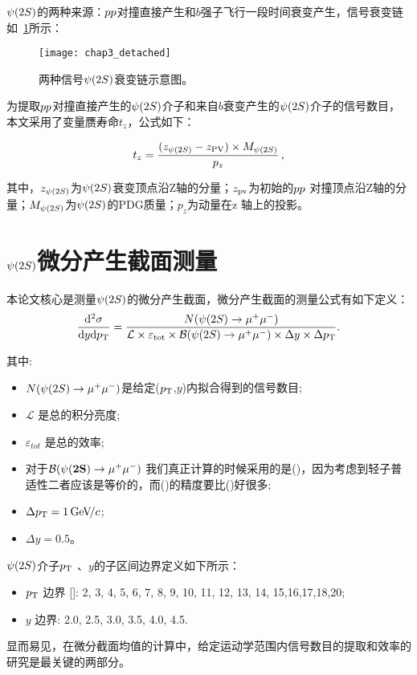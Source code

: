 ${\psi{(2S)}}$的两种来源：${pp}$对撞直接产生和$b$强子飞行一段时间衰变产生，信号衰变链如~\ref{decay}所示：
\begin{figure}[!h]
\centering
\texttt{[image: chap3\_detached]}
\caption{两种信号${\psi{(2S)}}$衰变链示意图。}
\label{decay}
\end{figure}
为提取${pp}$对撞直接产生的${\psi{(2S)}}$介子和来自$b$衰变产生的${\psi{(2S)}}$介子的信号数目，本文采用了变量赝寿命$t_{z}$，公式如下：

\begin{equation}\label{eq:tz}
t_z = \frac{(z_{{\psi{(2S)}}}-z_{\rm PV}) \times M_{{\psi{(2S)}}}}{p_z} \,,
\end{equation}

其中，$z_{{\psi{(2S)}}}$为${\psi{(2S)}}$衰变顶点沿Z轴的分量；$z_{\rm pv}$为初始的${pp}$ 对撞顶点沿Z轴的分量；$M_{{\psi{(2S)}}}$为${\psi{(2S)}}$的PDG质量；$p_{z}$为动量在z 轴上的投影。


\section{${\psi{(2S)}}$微分产生截面测量}
本论文核心是测量${\psi{(2S)}}$的微分产生截面，微分产生截面的测量公式有如下定义：
\begin{equation}
  \frac{\mathrm{d}^2\sigma}{\mathrm{d} y\mathrm{d} \mbox{$p_{\mathrm{ T}}$}} 
  = \frac{N({{\psi{(2S)}}\rightarrow{\ensuremath{\mu^+\mu^-}}})}
         {\mathcal{L}\times{\ensuremath{\varepsilon_{\mathrm{ tot}}}}\times {\ensuremath{\mathcal{B}}}({{\psi{(2S)}}\rightarrow{\ensuremath{\mu^+\mu^-}}})\times\Delta y \times \Delta \mbox{$p_{\mathrm{ T}}$}}. 
\label{eq:CrossSec}
\end{equation}

其中:
\begin{itemize}
\item $N({\psi{(2S)}}\rightarrow\mu^{+}\mu^{-})$是给定($\mbox{$p_{\mathrm{ T}}$}$,$y$)内拟合得到的信号数目;
\item $\mathcal L$ 是总的积分亮度;
\item $\varepsilon_{tot}$ 是总的效率;
\item 对于$\mathcal B(\mathbf{{\psi{(2S)}}\rightarrow\mu^{+}\mu^{-}})$ 我们真正计算的时候采用的是\BR(\psiee)，因为考虑到轻子普适性二者应该是等价的，而\BR(\psiee)的精度要比\BR(\psimumu)好很多;
\item $\Delta \mbox{$p_{\mathrm{ T}}$}=1{\mathrm{\,Ge\kern -0.1em V\!/}c}$;
\item $\Delta y=0.5$。
\end{itemize}

${\psi{(2S)}}$介子$\mbox{$p_{\mathrm{ T}}$}$ 、$y$的子区间边界定义如下所示：
\begin{itemize}
  \item $\mbox{$p_{\mathrm{ T}}$}$ 边界 [\gevc]: 2, 3, 4, 5, 6, 7, 8, 9, 10, 11, 12, 13, 14, 15,16,17,18,20; 
  \item $y$ 边界: 2.0, 2.5, 3.0, 3.5, 4.0, 4.5.
\end{itemize}

显而易见，在微分截面均值的计算中，给定运动学范围内信号数目的提取和效率的研究是最关键的两部分。


